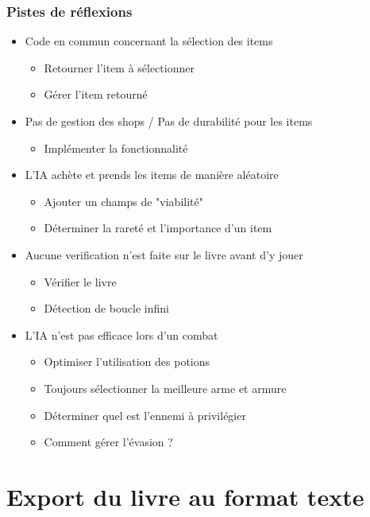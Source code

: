 \documentclass[beamer]{BetterDocument}
\begin{document}
	\begin{frame}
		\frametitle{Pistes de réflexions}

		\begin{itemize}
			\item{Code en commun concernant la sélection des items}
			\begin{itemize}
				\item{Retourner l'item à sélectionner}
				\item{Gérer l'item retourné}
			\end{itemize}

			\item{Pas de gestion des shops / Pas de durabilité pour les items}
			\begin{itemize}
				\item{Implémenter la fonctionnalité}
			\end{itemize}

			\item{L'IA achète et prends les items de manière aléatoire}
			\begin{itemize}
				\item{Ajouter un champs de "viabilité"}
				\item{Déterminer la rareté et l'importance d'un item}
			\end{itemize}

			\item{Aucune verification n'est faite sur le livre avant d'y jouer}
			\begin{itemize}
				\item{Vérifier le livre}
				\item{Détection de boucle infini}
			\end{itemize}

			\item{L'IA n'est pas efficace lors d'un combat}
			\begin{itemize}
				\item{Optimiser l'utilisation des potions}
				\item{Toujours sélectionner la meilleure arme et armure}
				\item{Déterminer quel est l'ennemi à privilégier}
				\item{Comment gérer l'évasion ?}
			\end{itemize}
		\end{itemize}
	\end{frame}

	\section{Export du livre au format texte}
\end{document}
